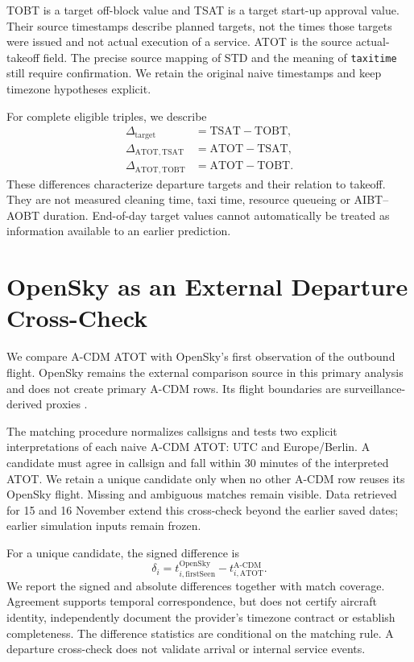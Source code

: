 TOBT is a target off-block value and TSAT is a target start-up approval value. Their source timestamps describe planned targets, not the times those targets were issued and not actual execution of a service. ATOT is the source actual-takeoff field. The precise source mapping of STD and the meaning of \texttt{taxitime} still require confirmation. We retain the original naive timestamps and keep timezone hypotheses explicit.

For complete eligible triples, we describe
\begin{align}
\Delta_{\mathrm{target}}&=\mathrm{TSAT}-\mathrm{TOBT},\\
\Delta_{\mathrm{ATOT,TSAT}}&=\mathrm{ATOT}-\mathrm{TSAT},\\
\Delta_{\mathrm{ATOT,TOBT}}&=\mathrm{ATOT}-\mathrm{TOBT}.
\end{align}
These differences characterize departure targets and their relation to takeoff. They are not measured cleaning time, taxi time, resource queueing or AIBT--AOBT duration. End-of-day target values cannot automatically be treated as information available to an earlier prediction.

\section{OpenSky as an External Departure Cross-Check}
We compare A-CDM ATOT with OpenSky's first observation of the outbound flight. OpenSky remains the external comparison source in this primary analysis and does not create primary A-CDM rows. Its flight boundaries are surveillance-derived proxies \cite{opensky_rest}.

The matching procedure normalizes callsigns and tests two explicit interpretations of each naive A-CDM ATOT: UTC and Europe/Berlin. A candidate must agree in callsign and fall within 30 minutes of the interpreted ATOT. We retain a unique candidate only when no other A-CDM row reuses its OpenSky flight. Missing and ambiguous matches remain visible. Data retrieved for 15 and 16 November extend this cross-check beyond the earlier saved dates; earlier simulation inputs remain frozen.

For a unique candidate, the signed difference is
\begin{equation}
\delta_i=t^{\mathrm{OpenSky}}_{i,\mathrm{firstSeen}}-t^{\mathrm{A\mbox{-}CDM}}_{i,\mathrm{ATOT}}.
\end{equation}
We report the signed and absolute differences together with match coverage. Agreement supports temporal correspondence, but does not certify aircraft identity, independently document the provider's timezone contract or establish completeness. The difference statistics are conditional on the matching rule. A departure cross-check does not validate arrival or internal service events.

